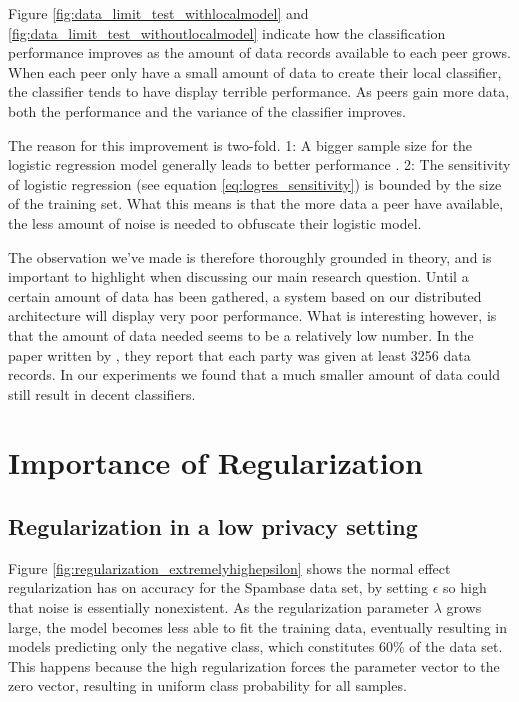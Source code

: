 Figure \ref{fig:data_limit_test_withlocalmodel} and \ref{fig:data_limit_test_withoutlocalmodel} indicate how the classification performance improves as the amount of data records available to each peer grows. When each peer only have a small amount of data to create their local classifier, the classifier tends to have display terrible performance. As peers gain more data, both the performance and the variance of the classifier improves.     

The reason for this improvement is two-fold. 1: A bigger sample size for the logistic regression model generally leads to better performance \cite{peduzzi1996simulation}. 2: The sensitivity of logistic regression (see equation \ref{eq:logres_sensitivity}) is bounded by the size of the training set. What this means is that the more data a peer have available, the less amount of noise is needed to obfuscate their logistic model. 

The observation we've made is therefore thoroughly grounded in theory, and is important to highlight when discussing our main research question. Until a certain amount of data has been gathered, a system based on our distributed architecture will display very poor performance. What is interesting however, is that the amount of data needed seems to be a relatively low number. In the paper written by \cite{pathak2010diffprivhomo}, they report that each party was given at least 3256 data records. In our experiments we found that a much smaller amount of data could still result in decent classifiers. 	  	

\section{Importance of Regularization}

\subsection{Regularization in a low privacy setting}
Figure \ref{fig:regularization_extremelyhighepsilon} shows the normal effect regularization has on accuracy for the Spambase data set, by setting $\epsilon$ so high that noise is essentially nonexistent. As the regularization parameter $\lambda$ grows large, the model becomes less able to fit the training data, eventually resulting in models predicting only the negative class, which constitutes 60\% of the data set. This happens because the high regularization forces the parameter vector to the zero vector, resulting in uniform class probability for all samples. 

